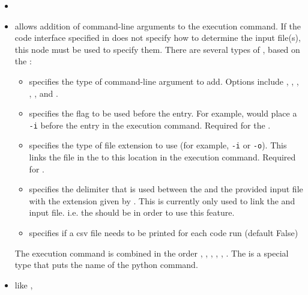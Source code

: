 \begin{itemize}
  \item {}
  \item {}  allows addition of
  command-line arguments to the execution command.  If the code interface
  specified in   does not specify how to
  determine the input file(s), this node must be used to specify them.
  There are several types of , based on the :
  \begin{itemize}
    \item {}  specifies the type of
    command-line argument to add.  Options include ,
    , , ,
    , and .
    \item {}  specifies the flag to
    be used before the entry.  For example,  would
    place a \texttt{-i} before the entry in the execution command.  Required for
    the  .
    \item {}  specifies the type
    of file extension to use (for example, \texttt{-i} or \texttt{-o}).  This links the
     file in the  to this location in the execution
    command.  Required for  .
    \item {}  specifies the delimiter
      that is used between the  and the provided input file with
      the extension given by .
      \nb This is currently only used to link the  and input file. i.e.
      the  should be  in order to use this feature.
   \item {}  specifies if a csv file needs to be 
      printed for each code run (default False)
  \end{itemize}
  The execution command is combined in the order , 
  , , , ,
  .  The  is a special type that puts the name of the python command.
  \item {}  like ,

\end{itemize}
